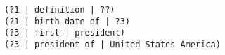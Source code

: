 \begin{verbatim}
(?1 | definition | ??)
(?1 | birth date of | ?3)
(?3 | first | president)
(?3 | president of | United States America)
\end{verbatim}
